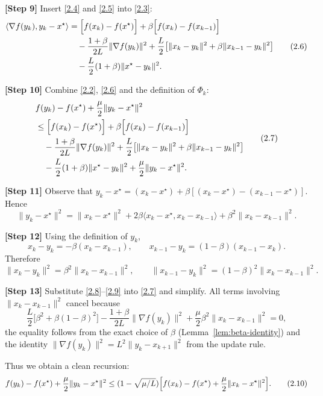 \documentclass[11pt]{article}
\begin{document}
\noindent\textbf{[Step 9]}  Insert \eqref{2.4} and \eqref{2.5} into \eqref{2.3}:
\[
\begin{aligned}
    \langle\nabla f(y_k),y_k-x^\star\rangle
    &=\Bigl[f(x_k)-f(x^\star)\Bigr]
      +\beta\Bigl[f(x_k)-f(x_{k-1})\Bigr]   \\
    &\quad -\frac{1+\beta}{2L}\|\nabla f(y_k)\|^2
      +\frac{L}{2}\bigl[\|x_k-y_k\|^2 +\beta\|x_{k-1}-y_k\|^2\bigr] \\
    &\quad -\frac{L}{2}(1+\beta)\|x^\star-y_k\|^2 .
\end{aligned}
\tag{2.6}
\]

\noindent\textbf{[Step 10]}  Combine \eqref{2.2}, \eqref{2.6} and the definition of $\Phi_k$:
\[
\begin{aligned}
    &f(y_k)-f(x^\star)+\frac{\mu}{2}\|y_k-x^\star\|^2 \\
    &\le \Bigl[f(x_k)-f(x^\star)\Bigr]
          +\beta\Bigl[f(x_k)-f(x_{k-1})\Bigr] \\
    &\quad -\frac{1+\beta}{2L}\|\nabla f(y_k)\|^2
          +\frac{L}{2}\bigl[\|x_k-y_k\|^2 +\beta\|x_{k-1}-y_k\|^2\bigr] \\
    &\quad -\frac{L}{2}(1+\beta)\|x^\star-y_k\|^2
          +\frac{\mu}{2}\|y_k-x^\star\|^2 .
\end{aligned}
\tag{2.7}
\]

\noindent\textbf{[Step 11]}  Observe that $y_k-x^\star = (x_k-x^\star)+\beta[(x_k-x^\star)-(x_{k-1}-x^\star)]$.
Hence
\[
\|y_k-x^\star\|^2 = \|x_k-x^\star\|^2
   +2\beta\langle x_k-x^\star, x_k-x_{k-1}\rangle
   +\beta^2\|x_k-x_{k-1}\|^2 .
\tag{2.8}
\]

\noindent\textbf{[Step 12]}  Using the definition of $y_k$,
\[
    x_k-y_k = -\beta (x_k-x_{k-1}),\qquad
    x_{k-1}-y_k = (1-\beta)(x_{k-1}-x_k) .
\]
Therefore
\[
\|x_k-y_k\|^2 = \beta^2\|x_k-x_{k-1}\|^2,\qquad
\|x_{k-1}-y_k\|^2 = (1-\beta)^2\|x_k-x_{k-1}\|^2 .
\tag{2.9}
\]

\noindent\textbf{[Step 13]}  Substitute \eqref{2.8}–\eqref{2.9} into \eqref{2.7} and simplify.
All terms involving $\|x_k-x_{k-1}\|^2$ cancel because
\[
\frac{L}{2}\bigl[\beta^2 +\beta(1-\beta)^2\bigr]
   -\frac{1+\beta}{2L}\|\nabla f(y_k)\|^2
   +\frac{\mu}{2}\beta^2\|x_k-x_{k-1}\|^2 =0,
\]
the equality follows from the exact choice of $\beta$ (Lemma~\ref{lem:beta-identity}) and the identity
$\|\nabla f(y_k)\|^2 = L^2\|y_k-x_{k+1}\|^2$ from the update rule.

Thus we obtain a clean recursion:
\[
    f(y_k)-f(x^\star)+\frac{\mu}{2}\|y_k-x^\star\|^2
    \le (1-\sqrt{\mu/L})\Bigl[f(x_k)-f(x^\star)+\frac{\mu}{2}\|x_k-x^\star\|^2\Bigr].
\tag{2.10}
\]
\end{document}
